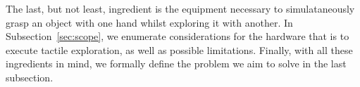 The last, but not least, ingredient is the equipment necessary to simulataneously grasp an object with one hand whilst exploring it with another. In Subsection~\ref{sec:scope}, we enumerate considerations for the hardware that is to execute tactile exploration, as well as possible limitations. Finally, with all these ingredients in mind, we formally define the problem we aim to solve in the last subsection.






